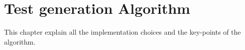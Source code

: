 \chapter{Test generation Algorithm}\label{ch:testGenAlg}
This chapter explain all the implementation choices and the key-points of the algorithm.




\newpage